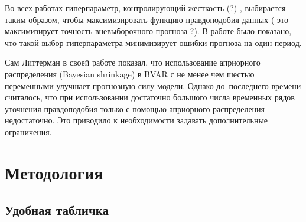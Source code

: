 \documentclass[11pt]{article} %
\begin{document}
Во всех работах гиперпараметр, контролирующий жесткость (?) , выбирается таким образом, чтобы максимизировать функцию правдоподобия  данных ( это максимизирует точность вневыборочного прогноза ?). В работе \cite{geweke_whiteman_2006_bayesian} было показано, что такой выбор гиперпараметра минимизирует ошибки прогноза на один период.


Сам Литтерман в своей работе показал, что использование априорного распределения (Bayesian shrinkage) в BVAR с  не менее  чем шестью переменными  улучшает прогнозную силу модели. Однако до~последнего времени считалось, что при использовании достаточно большого числа временных рядов уточнения правдоподобия только с помощью априорного распределения недостаточно.  Это приводило к необходимости задавать дополнительные ограничения.

\section{Методология}

\subsection{Удобная табличка}
\end{document}
